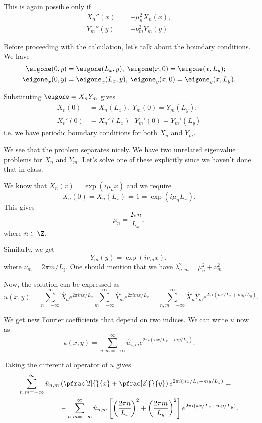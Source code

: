 \begin{frame}
	This is again possible only if 
	\[  
	\begin{split}
		X_n''(x) &= -\mu_n^2 X_n(x), \\
		Y_m''(y) &= -\nu_m^2 Y_m(y).
	\end{split}
	\]
	
	\pause
	Before proceeding with the calculation, let's talk about the boundary conditions. We have 
	\[  
	\begin{split}
		\eigone(0,y) &= \eigone(L_x,y), \; \eigone(x,0)=\eigone(x,L_y); \\
		\eigone_x(0,y) &= \eigone_x(L_x,y), \; \eigone_y(x,0)=\eigone_y(x,L_y). 
	\end{split}
	\]
	
	\pause
	Substituting $\eigone = X_n Y_m$ gives
	\[  
	\begin{split}
		X_n(0) &= X_n(L_x), \; Y_m(0)=Y_m(L_y); \\
		X_n'(0) &= X_n'(L_x), \; Y_m'(0)=Y_m'(L_y)
	\end{split}
	\]
	i.e. we have periodic boundary conditions for both $X_n$ and $Y_m$. 
\end{frame}

\begin{frame}
	We see that the problem separates nicely. We have two unrelated eigenvalue problems for $X_n$ and $Y_m$. Let's solve one of these explicitly since we haven't done that in class.
	
	\pause
	We know that $X_n(x) = \exp(i\mu_n x)$ and we require 
	\[  
	X_n(0) = X_n(L_x) \Leftrightarrow 1 = \exp(i\mu_n L_x).
	\]
	This gives 
	\[  
	\mu_n = \frac{2\pi n}{L_x},
	\]
	where $ n\in \Z $. 
	
	\pause
	Similarly, we get 
	\[  
	Y_m(y) = \exp(i \nu_m x),
	\]
	where $ \nu_m = 2\pi m/L_y $. One should mention that we have $ \lambda_{n,m}^2 = \mu_n^2 + \nu_m^2 $.
	
	\pause
	Now, the solution can be expressed as 
	\[  
	u(x,y) = \sum_{n=-\infty}^{\infty} \hat{X}_n e^{2\pi i n x/L_x} \sum_{m=-\infty}^{\infty} \hat{Y}_m e^{2\pi i m x/L_x} = \sum_{n,m=-\infty}^{\infty} \hat{X}_n \hat{Y}_m e^{2\pi i (nx/L_x+my/L_y) }.
	\]
\end{frame}

\begin{frame}
	We get new Fourier coefficients that depend on two indices. We can write $ u $ now as 
	\begin{equation}\label{eq:fourier_expansion}
		u(x,y) = \sum_{n,m=-\infty}^{\infty} \hat{u}_{n,m} e^{2\pi i (nx/L_x+my/L_y) }.
	\end{equation}
	
	\pause
	Taking the differential operator of $ u $ gives
	\[  
	\begin{split}
	\sum_{n,m=-\infty}^{\infty} \hat{u}_{n,m} &\left(\pfrac[2]{}{x} + \pfrac[2]{}{y} \right)e^{2\pi i (nx/L_x+my/L_y) } =  \\
	&-\sum_{n,m=-\infty}^{\infty} \hat{u}_{n,m} \left[
	\left(\frac{2\pi n}{L_x} \right)^2 + \left(\frac{2\pi m}{L_y}\right)^2 
	\right]
	e^{2\pi i (nx/L_x+my/L_y) }.
	\end{split}
	\]
\end{frame}

